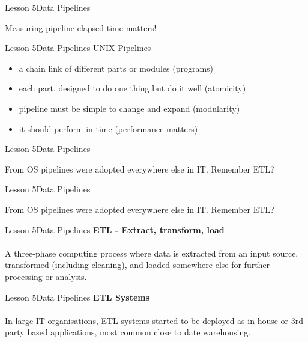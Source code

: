 \documentclass[aspectratio=1610]{beamer}
\begin{document}
\begin{frame}{Lesson 5}{Data Pipelines}
\Huge
\begin{center}
Measuring pipeline elapsed time matters!
\end{center}
\end{frame}


\begin{frame}{Lesson 5}{Data Pipelines}
\LARGE
UNIX Pipelines
\begin{itemize}
    \item a chain link of different parts or modules (programs)
    \item each part, designed to do one thing but do it well (atomicity)
    \item pipeline must be simple to change and expand (modularity)
    \item it should perform in time (performance matters)
\end{itemize}
\end{frame}


\begin{frame}{Lesson 5}{Data Pipelines}
\Huge
\begin{center}
From OS pipelines were adopted everywhere else in IT. Remember ETL?
\end{center}
\end{frame}



\begin{frame}{Lesson 5}{Data Pipelines}
\Huge
\begin{center}
From OS pipelines were adopted everywhere else in IT. Remember \alert{ETL}?
\end{center}
\end{frame}



\begin{frame}{Lesson 5}{Data Pipelines}
\LARGE
\textbf{ETL - Extract, transform, load}\\~\\
A three-phase computing process where data is extracted from an input source, 
transformed (including cleaning), and loaded somewhere else for further 
processing or analysis.
\end{frame}


\begin{frame}{Lesson 5}{Data Pipelines}
\LARGE
\textbf{ETL Systems}\\~\\
In large IT organisations, \alert{ETL systems} started to be deployed as 
in-house or 3rd party based applications, most common close to \alert{date 
warehousing}. 
\end{frame}
\end{document}
